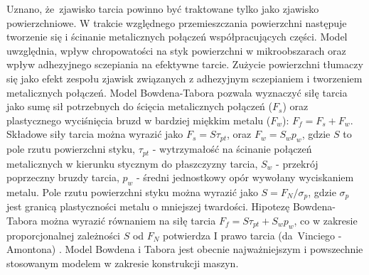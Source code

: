 \documentclass[12pt,a4paper,openright]{report} %
\begin{document}
Uznano, że~zjawisko tarcia powinno być traktowane tylko jako zjawisko powierzchniowe. W trakcie względnego przemieszczania powierzchni następuje tworzenie się i ścinanie metalicznych połączeń współpracujących części. Model uwzględnia, wpływ chropowatości na styk powierzchni w mikroobszarach oraz wpływ adhezyjnego sczepiania na efektywne tarcie. Zużycie powierzchni tłumaczy się jako efekt zespołu zjawisk związanych z adhezyjnym sczepianiem i tworzeniem metalicznych połączeń. Model Bowdena-Tabora pozwala wyznaczyć siłę tarcia jako sumę sił potrzebnych do ścięcia metalicznych połączeń ($F_s$) oraz plastycznego wyciśnięcia bruzd w bardziej miękkim metalu ($F_w$): $F_f = F_s + F_w$. Składowe siły tarcia można wyrazić jako $F_s = S \tau_{pt}$, oraz $F_w = S_w p_w$, gdzie $S$ to pole rzutu powierzchni styku, $\tau_{pt}$ - wytrzymałość na ścinanie połączeń metalicznych w kierunku stycznym do płaszczyzny tarcia, $S_w$ - przekrój poprzeczny bruzdy tarcia, $p_w$ - średni jednostkowy opór wywołany wyciskaniem metalu. Pole rzutu powierzchni styku można wyrazić jako $S={F_N}/\sigma_p$, gdzie $\sigma_p$ jest granicą plastyczności metalu o mniejszej twardości. Hipotezę Bowdena-Tabora można wyrazić równaniem na siłę tarcia $F_f = S \tau_{pt} + S_w p_w$, co w zakresie proporcjonalnej zależności $S$ od $F_N$ potwierdza I prawo tarcia (da~Vinciego - Amontona) \cite{Borys}. Model Bowdena i Tabora jest obecnie najważniejszym i powszechnie stosowanym modelem w zakresie konstrukcji maszyn.
%
\end{document}
